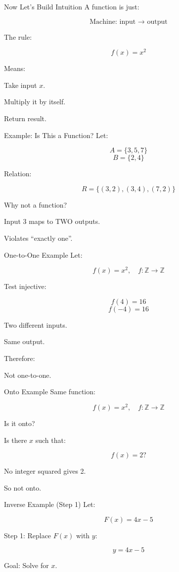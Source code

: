 \documentclass[aspectratio=169]{beamer}
\begin{document}
\begin{frame}{Now Let’s Build Intuition}
A function is just:

\[
\text{Machine: input } \to \text{ output}
\]

The rule:

\[
f(x) = x^2
\]

Means:

Take input $x$.

Multiply it by itself.

Return result.
\end{frame}

\begin{frame}{Example: Is This a Function?}
Let:

\[
A = \{3,5,7\}
\]
\[
B = \{2,4\}
\]

Relation:

\[
R = \{(3,2),(3,4),(7,2)\}
\]

Why not a function?

Input 3 maps to TWO outputs.

Violates ``exactly one''.
\end{frame}

\begin{frame}{One-to-One Example}
Let:

\[
f(x)=x^2, \quad f:\mathbb{Z}\to\mathbb{Z}
\]

Test injective:

\[
f(4)=16
\]
\[
f(-4)=16
\]

Two different inputs.

Same output.

Therefore:

Not one-to-one.
\end{frame}

\begin{frame}{Onto Example}
Same function:

\[
f(x)=x^2, \quad f:\mathbb{Z}\to\mathbb{Z}
\]

Is it onto?

Is there $x$ such that:

\[
f(x)=2?
\]

No integer squared gives 2.

So not onto.
\end{frame}

\begin{frame}{Inverse Example (Step 1)}
Let:

\[
F(x)=4x-5
\]

Step 1: Replace $F(x)$ with $y$:

\[
y=4x-5
\]

Goal: Solve for $x$.
\end{frame}
\end{document}
